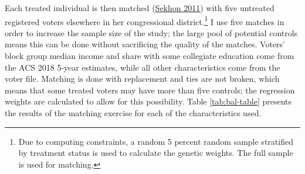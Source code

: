 \documentclass[
  12pt,
]{article}
\begin{document}
Each treated individual is then matched (\protect\hyperlink{ref-Sekhon2011}{Sekhon 2011}) with five untreated registered voters elsewhere in her congressional district.\footnote{Due to computing constraints, a random 5 percent random sample stratified by treatment status is used to calculate the genetic weights. The full sample is used for matching.} I use five matches in order to increase the sample size of the study; the large pool of potential controls means this can be done without sacrificing the quality of the matches. Voters' block group median income and share with some collegiate education come from the ACS 2018 5-year estimates, while all other characteristics come from the voter file. Matching is done with replacement and ties are not broken, which means that some treated voters may have more than five controls; the regression weights are calculated to allow for this possibility. Table \ref{tab:bal-table} presents the results of the matching exercise for each of the characteristics used.
\end{document}

